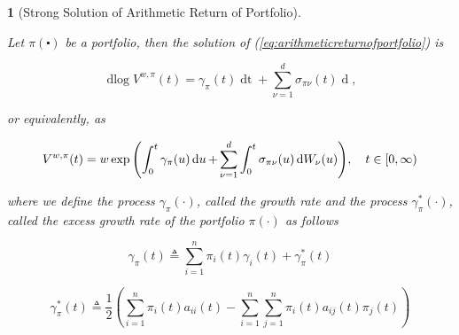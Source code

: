 \documentclass[british]{amsart} \usepackage{lmodern}
\numberwithin{equation}{section} \numberwithin{figure}{section}
\theoremstyle{plain} \newtheorem{thm}{\protect\theoremname}[section]
\theoremstyle{definition} \newtheorem{defn}[thm]{\protect\definitionname}
\theoremstyle{plain} \newtheorem{assumption}[thm]{\protect\assumptionname}
\theoremstyle{plain} \newtheorem{lem}[thm]{\protect\lemmaname}
\theoremstyle{plain} \newtheorem{prop}[thm]{\protect\propositionname}
\theoremstyle{remark} \newtheorem{rem}[thm]{\protect\remarkname}
\theoremstyle{plain} \newtheorem{cor}[thm]{\protect\corollaryname}
\renewcommand{\d}[1]{\mathop{\mathrm{d}{#1}}}
\newcommand{\defeq}{\mathop{\triangleq}} \newcommand{\almostsurely}{\text{a.s.}}
\newcommand{\V}{V^{w,\pi}}
\begin{document}
\begin{prop} [Strong Solution of Arithmetic Return of Portfolio]
  \label{prop:solutionofarithmeticreturnofportfolio}

  Let $\pi(\centerdot)$ be a portfolio, then the solution of
  (\ref{eq:arithmeticreturnofportfolio}) is

  \begin{equation}
    \label{eq:solutionofarithmeticreturnofportfoliodiff}
    \d\log{\V(t)} =  
        \gamma_{\pi}(t) \d{t} +
        \sum_{\nu=1}^{d} \sigma_{\pi\nu}(t) \d{W_{\nu}(t)} ,
  \end{equation}

  or equivalently, as

  \begin{equation}
    \label{eq:solutionofarithmeticreturnofportfolio}
    \V(t) = w \exp{ 
      \left(
        \int_{0}^{t} \gamma_{\pi}(u) \d{u} +
        \sum_{\nu=1}^{d} \int_{0}^{t} \sigma_{\pi\nu}(u) \d{W_{\nu}(u)}
      \right)},
  \quad \ranget
  \end{equation}

  where we define the process $\gamma_{\pi}(\cdot)$, called the \textit{growth
  rate} and the process $\gamma_{\pi}^{*}(\cdot)$, called the \textit{excess
  growth rate} of the portfolio $\pi(\cdot)$ as follows

  \begin{equation}
    \label{eq:portfoliogrowthrate}
    \gamma_{\pi}(t) \defeq 
      \sum_{i=1}^{n} \pi_{i}(t)\gamma_{i}(t) + 
      \gamma_{\pi}^{*}(t)
  \end{equation}

  \begin{equation}
    \label{eq:portfolioexcessgrowthrate}
    \gamma_{\pi}^{*}(t) \defeq \frac{1}{2} 
        \left(
          \sum_{i=1}^{n} \pi_{i}(t)a_{ii}(t) -
          \sum_{i=1}^{n} \sum_{j=1}^{n} \pi_{i}(t)a_{ij}(t)\pi_{j}(t)
        \right)
  \end{equation}

\end{prop}
\end{document}
